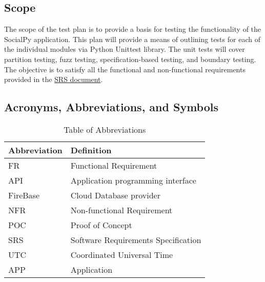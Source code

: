 \documentclass[12pt, titlepage]{article}
\begin{document}
\subsection{Scope}
The scope of the test plan is to provide a basis for testing the functionality of the SocialPy application. This plan will provide a means of outlining tests for each of the individual modules via Python Unittest library. The unit tests will cover partition testing, fuzz testing, specification-based testing, and boundary testing. The objective is to satisfy all the functional and non-functional requirements provided in the \href{https://gitlab.cas.mcmaster.ca/zamana11/se3xa3-project/-/tree/master/Doc/SRS)}{SRS document}.

\subsection{Acronyms, Abbreviations, and Symbols}
\begin{table}[hbp]
    \caption{Table of Abbreviations}
    \label{Table of Abbreviations}
    \begin{tabularx}{\textwidth}{p{3cm}X}
        \toprule
        \textbf{Abbreviation} & \textbf{Definition} \\
        \midrule
        FR & Functional Requirement\\
        API & Application programming interface\\
        FireBase & Cloud Database provider\\
        NFR & Non-functional Requirement\\
        POC & Proof of Concept\\
        SRS & Software Requirements Specification\\
        UTC & Coordinated Universal Time\\
        APP & Application\\
        \bottomrule
    \end{tabularx}
\end{table}
\end{document}
